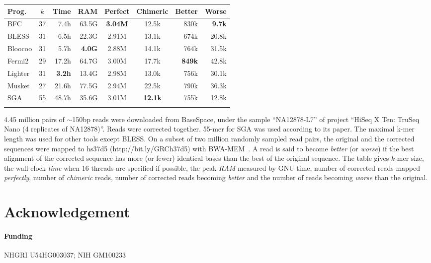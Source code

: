 \documentclass{bioinfo}
\begin{document}
\begin{table}[ht]
{\footnotesize
\begin{tabular}{lcrrccrr}
\toprule
Prog.     & $k$ & Time & RAM   & Perfect & Chimeric & Better & Worse \\
\midrule
BFC       & 37    & 7.4h & 63.5G &{\bf 3.04M}& 12.5k  & 830k   &{\bf 9.7k} \\
BLESS     & 31    & 6.5h & 22.3G & 2.91M   & 13.1k    & 674k   & 20.8k  \\
Bloocoo   & 31    &5.7h&{\bf 4.0G}& 2.88M  & 14.1k    & 764k   & 31.5k  \\
Fermi2    & 29    &17.2h & 64.7G & 3.00M   & 17.7k    &{\bf 849k}&42.8k \\
Lighter   & 31    &{\bf 3.2h}& 13.4G&2.98M & 13.0k    & 756k   & 30.1k  \\
Musket    & 27    &21.6h & 77.5G & 2.94M   & 22.5k    & 790k   & 36.3k  \\
SGA       & 55    &48.7h & 35.6G & 3.01M  &{\bf 12.1k}& 755k   & 12.8k  \\
\botrule
\end{tabular}}{4.45 million pairs of $\sim$150bp reads were
downloaded from BaseSpace, under the sample ``NA12878-L7'' of project
``HiSeq X Ten: TruSeq Nano (4 replicates of NA12878)''. Reads were corrected
together. 55-mer for SGA was used according to its paper. The maximal k-mer
length was used for other tools except BLESS. On a subset of two million
randomly sampled read pairs, the original and the corrected sequences were
mapped to hs37d5 (http://bit.ly/GRCh37d5) with BWA-MEM~\citep{Li:2013aa}. A
read is said to become \emph{better} (or \emph{worse}) if the best alignment of
the corrected sequence has more (or fewer) identical bases than the best of the
original sequence. The table gives $k$-mer size, the wall-clock \emph{time} when 16 threads
are specified if possible, the peak \emph{RAM} measured by GNU time, number of
corrected reads mapped \emph{perfectly}, number of \emph{chimeric} reads,
number of corrected reads becoming \emph{better} and the number of reads
becoming \emph{worse} than the original.}

\end{table}

\section*{Acknowledgement}
\paragraph{Funding\textcolon} NHGRI U54HG003037; NIH GM100233


\end{document}
